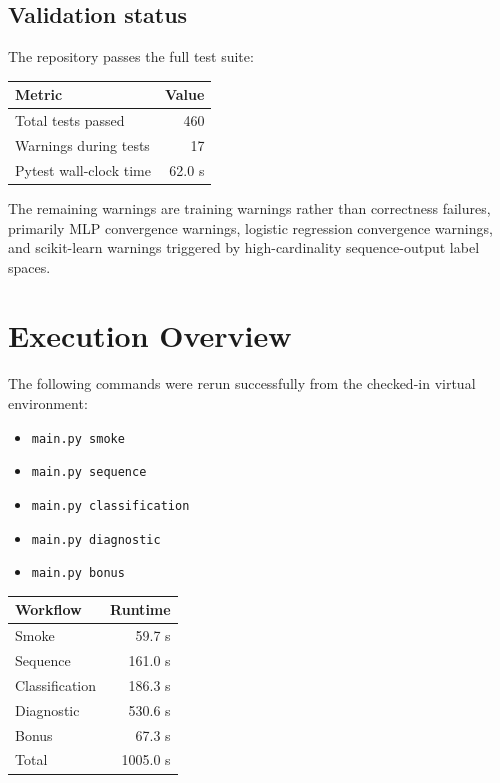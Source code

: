 \documentclass[11pt]{article}
\begin{document}
\subsection{Validation status}

The repository passes the full test suite:

\begin{center}
\begin{tabular}{lr}
\toprule
Metric & Value \\
\midrule
Total tests passed & 460 \\
Warnings during tests & 17 \\
Pytest wall-clock time & 62.0 s \\
\bottomrule
\end{tabular}
\end{center}

The remaining warnings are training warnings rather than correctness failures, primarily MLP convergence warnings, logistic regression convergence warnings, and scikit-learn warnings triggered by high-cardinality sequence-output label spaces.

\section{Execution Overview}

The following commands were rerun successfully from the checked-in virtual environment:

\begin{itemize}
  \item \texttt{main.py smoke}
  \item \texttt{main.py sequence}
  \item \texttt{main.py classification}
  \item \texttt{main.py diagnostic}
  \item \texttt{main.py bonus}
\end{itemize}

\begin{center}
\begin{tabular}{lr}
\toprule
Workflow & Runtime \\
\midrule
Smoke & 59.7 s \\
Sequence & 161.0 s \\
Classification & 186.3 s \\
Diagnostic & 530.6 s \\
Bonus & 67.3 s \\
\midrule
Total & 1005.0 s \\
\bottomrule
\end{tabular}
\end{center}
\end{document}
